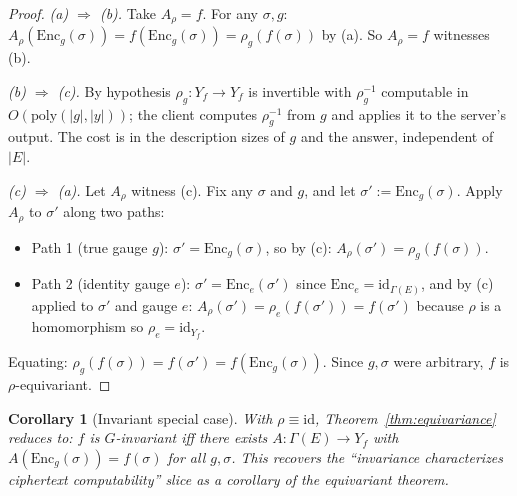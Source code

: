 \documentclass[11pt,letterpaper]{article}
\newtheorem{corollary}[theorem]{Corollary}
\begin{document}
\begin{proof}
\emph{(a) $\Rightarrow$ (b).} Take $A_\rho = f$. For any $\sigma, g$:
$A_\rho(\mathrm{Enc}_g(\sigma)) = f(\mathrm{Enc}_g(\sigma))
= \rho_g(f(\sigma))$ by (a). So $A_\rho = f$ witnesses (b).

\emph{(b) $\Rightarrow$ (c).} By hypothesis $\rho_g: Y_f \to Y_f$
is invertible with $\rho_g^{-1}$ computable in
$O(\mathrm{poly}(|g|, |y|))$; the client computes $\rho_g^{-1}$
from $g$ and applies it to the server's output. The cost is in
the description sizes of $g$ and the answer, independent of $|E|$.

\emph{(c) $\Rightarrow$ (a).} Let $A_\rho$ witness (c). Fix any
$\sigma$ and $g$, and let $\sigma' := \mathrm{Enc}_g(\sigma)$. Apply
$A_\rho$ to $\sigma'$ along two paths:
\begin{itemize}[nosep]
\item Path 1 (true gauge $g$): $\sigma' = \mathrm{Enc}_g(\sigma)$, so
  by (c): $A_\rho(\sigma') = \rho_g(f(\sigma))$.
\item Path 2 (identity gauge $e$): $\sigma' = \mathrm{Enc}_e(\sigma')$
  since $\mathrm{Enc}_e = \mathrm{id}_{\Gamma(E)}$, and by (c)
  applied to $\sigma'$ and gauge $e$:
  $A_\rho(\sigma') = \rho_e(f(\sigma')) = f(\sigma')$ because
  $\rho$ is a homomorphism so $\rho_e = \mathrm{id}_{Y_f}$.
\end{itemize}
Equating: $\rho_g(f(\sigma)) = f(\sigma')
= f(\mathrm{Enc}_g(\sigma))$. Since $g, \sigma$ were arbitrary,
$f$ is $\rho$-equivariant.
\end{proof}

\begin{corollary}[Invariant special case]
\label{cor:invariant-special-case}
With $\rho \equiv \mathrm{id}$,
Theorem~\ref{thm:equivariance} reduces to: $f$ is $G$-invariant
iff there exists $A: \Gamma(E) \to Y_f$ with
$A(\mathrm{Enc}_g(\sigma)) = f(\sigma)$ for all $g, \sigma$. This
recovers the ``invariance characterizes ciphertext computability''
slice as a corollary of the equivariant theorem.
\end{corollary}
\end{document}
